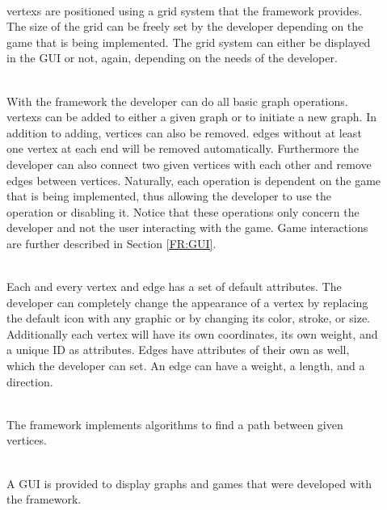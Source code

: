 \begin{description}
	\item[] \textbf{} \\
	\Glspl{vertex} are positioned using a grid system that the \gls{framework} provides. The size of the grid can be freely set by the \gls{developer} depending on the game that is being implemented. The grid system can either be displayed in the \gls{GUI} or not, again, depending on the needs of the developer.
   \item[] \textbf{} \\
	With the framework the developer can do all basic graph operations. \Glspl{vertex} can be added to either a given \gls{graph} or to initiate a new graph. In addition to adding, vertices can also be removed. \Glspl{edge} without at least one vertex at each end will be removed automatically. Furthermore the developer can also connect two given vertices with each other and remove edges between vertices. Naturally, each operation is dependent on the game that is being implemented, thus allowing the developer to use the operation or disabling it. Notice that these operations only concern the developer and not the user interacting with the game. Game interactions are further described in Section \ref{FR:GUI}.
	\item[] \textbf{} \\
	Each and every vertex and edge has a set of default attributes. The developer can completely change the appearance of a vertex by replacing the default icon with any graphic or by changing its color, stroke, or size. \\
Additionally each vertex will have its own coordinates, its own weight, and a unique \gls{ID} as attributes. Edges have attributes of their own as well, which the developer can set. An edge can have a weight, a length, and a direction.
	\item[] \textbf{} \\
The framework implements algorithms to find a \gls{path} between given vertices.
	\item[] \textbf{} \\
	A \gls{GUI} is provided to display graphs and games that were developed with the framework.

\end{description}
